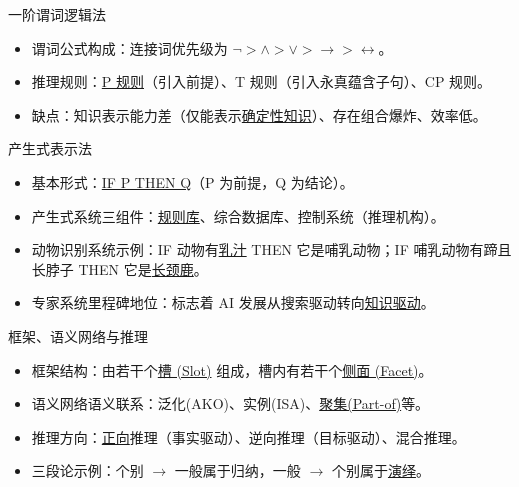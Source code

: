 \documentclass[11pt,a4paper]{ctexrep}
\newcommand{\fillblank}[1]{\underline{\hspace{2em}#1\hspace{2em}}}
\begin{document}
\begin{qbox}{一阶谓词逻辑法}
    \begin{itemize}
        \item 谓词公式构成：连接词优先级为 \fillblank{$\neg > \wedge > \vee > \rightarrow > \leftrightarrow$}。
        \item 推理规则：\fillblank{P 规则}（引入前提）、T 规则（引入永真蕴含子句）、CP 规则。
        \item 缺点：知识表示能力差（仅能表示\fillblank{确定性知识}）、存在组合爆炸、效率低。
    \end{itemize}
\end{qbox}

\begin{qbox}{产生式表示法}
    \begin{itemize}
        \item 基本形式：\fillblank{IF P THEN Q}（P 为前提，Q 为结论）。
        \item 产生式系统三组件：\fillblank{规则库}、综合数据库、控制系统（推理机构）。
        \item 动物识别系统示例：IF 动物有\fillblank{乳汁} THEN 它是哺乳动物；IF 哺乳动物有蹄且长脖子 THEN 它是\fillblank{长颈鹿}。
        \item 专家系统里程碑地位：标志着 AI 发展从搜索驱动转向\fillblank{知识驱动}。
    \end{itemize}
\end{qbox}

\begin{qbox}{框架、语义网络与推理}
    \begin{itemize}
        \item 框架结构：由若干个\fillblank{槽 (Slot)} 组成，槽内有若干个\fillblank{侧面 (Facet)}。
        \item 语义网络语义联系：泛化(AKO)、实例(ISA)、\fillblank{聚集(Part-of)}等。
        \item 推理方向：\fillblank{正向}推理（事实驱动）、逆向推理（目标驱动）、混合推理。
        \item 三段论示例：个别 $\to$ 一般属于归纳，一般 $\to$ 个别属于\fillblank{演绎}。
    \end{itemize}
\end{qbox}
\end{document}
